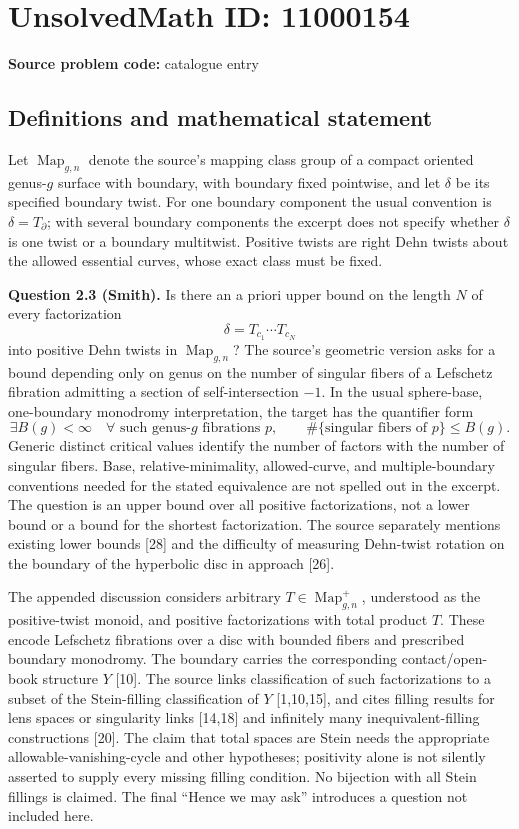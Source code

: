 \documentclass[11pt]{article}
\begin{document}
\section*{UnsolvedMath ID: 11000154}
\textbf{Source problem code:} catalogue entry
\subsection{Definitions and mathematical statement}
Let $\operatorname{Map}_{g,n}$ denote the source's mapping class group of a compact oriented genus-$g$ surface with boundary, with boundary fixed pointwise, and let $\delta$ be its specified boundary twist. For one boundary component the usual convention is $\delta=T_{\partial}$; with several boundary components the excerpt does not specify whether $\delta$ is one twist or a boundary multitwist. Positive twists are right Dehn twists about the allowed essential curves, whose exact class must be fixed.

\textbf{Question 2.3 (Smith).} Is there an a priori upper bound on the length $N$ of every factorization
\[
 \delta=T_{c_1}\cdots T_{c_N}
\]
into positive Dehn twists in $\operatorname{Map}_{g,n}$? The source's geometric version asks for a bound depending only on genus on the number of singular fibers of a Lefschetz fibration admitting a section of self-intersection $-1$. In the usual sphere-base, one-boundary monodromy interpretation, the target has the quantifier form
\[
 \exists B(g)<\infty\quad\forall\text{ such genus-}g\text{ fibrations }p,
 \qquad\#\{\text{singular fibers of }p\}\le B(g).
\]
Generic distinct critical values identify the number of factors with the number of singular fibers. Base, relative-minimality, allowed-curve, and multiple-boundary conventions needed for the stated equivalence are not spelled out in the excerpt. The question is an upper bound over all positive factorizations, not a lower bound or a bound for the shortest factorization. The source separately mentions existing lower bounds [28] and the difficulty of measuring Dehn-twist rotation on the boundary of the hyperbolic disc in approach [26].

The appended discussion considers arbitrary $T\in\operatorname{Map}_{g,n}^+$, understood as the positive-twist monoid, and positive factorizations with total product $T$. These encode Lefschetz fibrations over a disc with bounded fibers and prescribed boundary monodromy. The boundary carries the corresponding contact/open-book structure $Y$ [10]. The source links classification of such factorizations to a subset of the Stein-filling classification of $Y$ [1,10,15], and cites filling results for lens spaces or singularity links [14,18] and infinitely many inequivalent-filling constructions [20]. The claim that total spaces are Stein needs the appropriate allowable-vanishing-cycle and other hypotheses; positivity alone is not silently asserted to supply every missing filling condition. No bijection with all Stein fillings is claimed. The final ``Hence we may ask'' introduces a question not included here.
\end{document}
